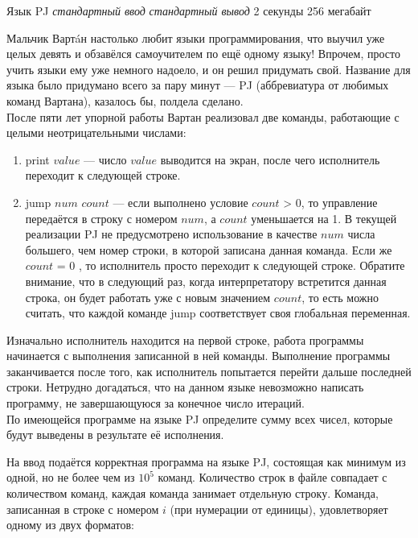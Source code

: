 \begin{problem}%
{Язык PJ}%
{\textsl{стандартный ввод}}%
{\textsl{стандартный вывод}}%
{2 секунды}%
{256 мегабайт}{}

Мальчик Вартáн настолько любит языки программирования, что выучил уже целых девять и обзавёлся самоучителем по ещё одному языку! Впрочем, просто учить языки ему уже немного надоело, и он решил придумать свой. Название для языка было придумано всего за пару минут — PJ (аббревиатура от любимых команд Вартана), казалось бы, полдела сделано.\\

После пяти лет упорной работы Вартан реализовал две команды, работающие с целыми неотрицательными числами:

\begin{enumerate}
    \item print $value$ — число $value$ выводится на экран, после чего исполнитель переходит к следующей строке.
    \item jump $num$ $count$ — если выполнено условие $count$ > 0, то управление передаётся в строку с номером $num$, а $count$ уменьшается на 1. В текущей реализации PJ не предусмотрено использование в качестве $num$ числа большего, чем номер строки, в которой записана данная команда. Если же $count$ = 0 , то исполнитель просто переходит к следующей строке. Обратите внимание, что в следующий раз, когда интерпретатору встретится данная строка, он будет работать уже с новым значением $count$, то есть можно считать, что каждой команде jump соответствует своя глобальная переменная.
\end{enumerate}

Изначально исполнитель находится на первой строке, работа программы начинается с выполнения записанной в ней команды. Выполнение программы заканчивается после того, как исполнитель попытается перейти дальше последней строки. Нетрудно догадаться, что на данном языке невозможно написать программу, не завершающуюся за конечное число итераций.\\

По имеющейся программе на языке PJ определите сумму всех чисел, которые будут выведены в результате её исполнения.

\InputFile

На ввод подаётся корректная программа на языке PJ, состоящая как минимум из одной, но не более чем из $10^5$ команд. Количество строк в файле совпадает с количеством команд, каждая команда занимает отдельную строку. Команда, записанная в строке с номером $i$ (при нумерации от единицы), удовлетворяет одному из двух форматов:


\end{problem}
